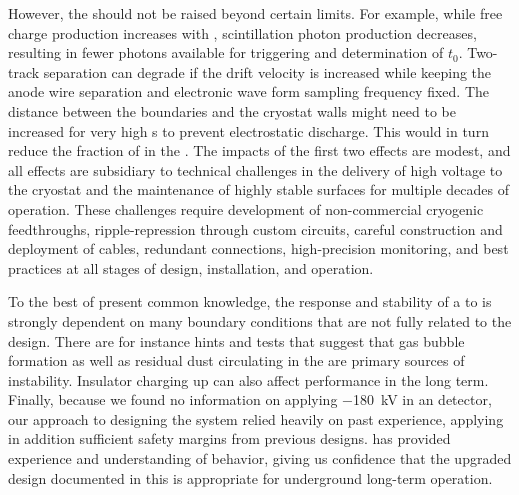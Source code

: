 However, the \efield should not be raised beyond certain limits. For example, while free charge production increases with \efield, scintillation photon production decreases, resulting in fewer photons available for triggering and determination of $t_0$. Two-track separation can degrade if the drift velocity is increased while keeping the anode wire separation and electronic wave form sampling frequency fixed. The distance between the  boundaries and the cryostat walls might  need to be increased for very high \efield{}s to prevent electrostatic discharge. This would in turn reduce the fraction of  in the . The impacts of the first two effects are modest, and all effects are subsidiary to technical challenges in the delivery of high voltage to the cryostat and the maintenance of highly stable    surfaces for multiple decades of operation. These challenges require development of non-commercial cryogenic  feedthroughs,  ripple-repression through custom   circuits, careful construction and deployment of  cables, redundant  connections, high-precision monitoring, and best practices at all stages of design, installation, and operation.


To the best of present common knowledge, the response and stability of a  to  is strongly dependent on many boundary conditions that are not fully related to the   design. There are for instance hints and tests that suggest that gas bubble formation as well as residual dust circulating in the  are  primary sources of  instability. Insulator charging up can also affect  performance in the long term.  
Finally, because we found no information on applying \SI{-180}{\kV} in an  detector, our approach to designing the  system relied heavily on past experience, applying in addition sufficient safety margins from previous designs.  has provided experience and understanding of  behavior, giving us confidence that the upgraded design documented in this  is appropriate for underground long-term operation.  

